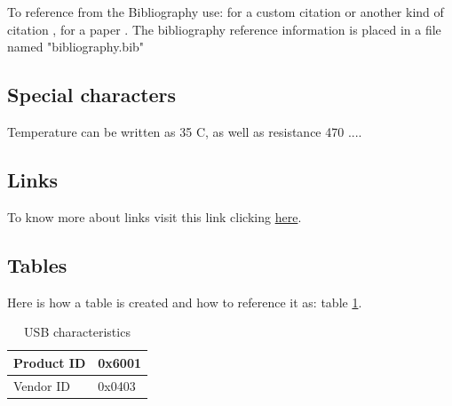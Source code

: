 To reference from the Bibliography use: for a custom citation \cite{adams1995hitchhiker} or another kind of citation \cite{myRefrenceCreated}, for a paper \cite{4690904}. The bibliography reference information is placed in a file named "bibliography.bib" \\


\subsection{Special characters}
Temperature can be written as 35 \degree C, as well as resistance 470 \ohm ....\\



\subsection{Links}
To know more about links visit this link clicking \href{https://en.wikibooks.org/wiki/LaTeX/Hyperlinks}{here}.


\subsection{Tables}

Here is how a table is created and how to reference it as: table \ref{tab: USB characteristics}.

\begin{table}[h]
  \centering
  \begin{tabular}{|l|l|}
    \hline
    Product ID & 0x6001 \\
    \hline
    Vendor ID & 0x0403 \\
    \hline
  \end{tabular}
  \caption{USB characteristics}
  \label{tab: USB characteristics}
\end{table}




